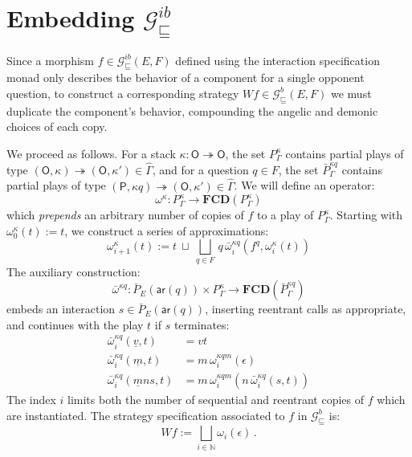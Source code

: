 \documentclass[draft,11pt]{report}
\newcommand{\gcat}{\mathcal{G}_{\sqsubseteq}}
\newcommand{\kw}[1]{\ensuremath{ \mathsf{#1} }}
\begin{document}

\section{Embedding $\gcat^{ib}$} \label{sec:gamesem:emb} %

Since a morphism $f \in \gcat^{ib}(E,F)$
defined using the interaction specification monad
only describes the behavior of a component
for a single opponent question,
to construct a corresponding strategy $W f \in \gcat^b(E,F)$
we must duplicate the component's behavior,
compounding the angelic and demonic choices of each copy.

We proceed as follows.
For a stack
$\kappa : \kw{O} \twoheadrightarrow \kw{O}$,
the set $P^\kappa_\Gamma$ contains
partial plays of type
$(\kw{O}, \kappa) \twoheadrightarrow (\kw{O}, \kappa')
 \in \hat{\Gamma}$,
and for a question $q \in F$,
the set $\bar{P}^{\kappa q}_\Gamma$ contains
partial plays of type
$(\kw{P}, \kappa q) \twoheadrightarrow (\kw{O}, \kappa')
 \in \hat{\Gamma}$.
We will define an operator:
\[
  \omega^\kappa :
    P^\kappa_\Gamma \rightarrow
    \mathbf{FCD}(P^\kappa_\Gamma)
\]
which \emph{prepends} an arbitrary number of copies of $f$
to a play of $P^\kappa_\Gamma$.
Starting with 
$\omega^\kappa_0(t) := t$,
we construct a series of approximations:
\[
  \omega^\kappa_{i+1}(t) :=
    t \: \sqcup \:
    \bigsqcup_{q \in F} \,
      q \, \bar{\omega}^{\kappa q}_i(f^q, \omega^\kappa_i(t))
\]
The auxiliary construction:
\[
  \bar{\omega}^{\kappa q} :
    \bar{P}_E(\kw{ar}(q)) \times P^{\kappa}_\Gamma \rightarrow
    \mathbf{FCD}(\bar{P}^{\kappa q}_\Gamma)
\]
embeds an interaction $s \in \bar{P}_E(\kw{ar}(q))$,
inserting reentrant calls as appropriate,
and continues with the play $t$
if $s$ terminates:
\begin{align*}
  \bar{\omega}^{\kappa q}_i(\underline v, t) &=
    v t
  \\
  \bar{\omega}^{\kappa q}_i(\underline m, t) &=
    m \, \omega^{\kappa q m}_i(\epsilon)
  \\
  \bar{\omega}^{\kappa q}_i(\underline m n s, t) &=
    m \, \omega^{\kappa q m}_i(n \, \bar{\omega}^{\kappa q}_i(s, t))
\end{align*}
The index $i$ limits both the number of
sequential and reentrant copies of $f$
which are instantiated.
The strategy specification associated to $f$
in $\gcat^{b}$ is:
\[
    W f := \bigsqcup_{i \in \mathbb{N}} \omega_i(\epsilon) \,.
\]

\end{document}
